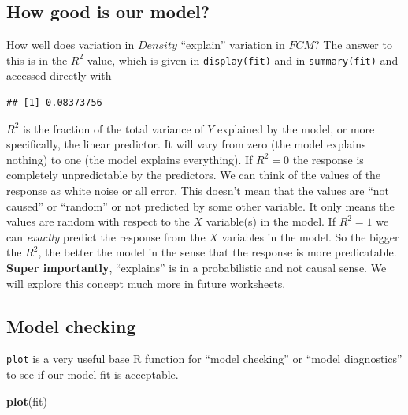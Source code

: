 \documentclass[]{book}
\newenvironment{Shaded}{\begin{snugshade}}{\end{snugshade}}
\newcommand{\KeywordTok}[1]{\textcolor[rgb]{0.13,0.29,0.53}{\textbf{#1}}}
\newcommand{\OperatorTok}[1]{\textcolor[rgb]{0.81,0.36,0.00}{\textbf{#1}}}
\newcommand{\NormalTok}[1]{#1}
\begin{document}
\subsection{How good is our model?}\label{how-good-is-our-model}

How well does variation in \(Density\) ``explain'' variation in \(FCM\)?
The answer to this is in the \(R^2\) value, which is given in
\texttt{display(fit)} and in \texttt{summary(fit)} and accessed directly
with

\begin{Shaded}
\end{Shaded}

\begin{verbatim}
## [1] 0.08373756
\end{verbatim}

\(R^2\) is the fraction of the total variance of \(Y\) explained by the
model, or more specifically, the linear predictor. It will vary from
zero (the model explains nothing) to one (the model explains
everything). If \(R^2=0\) the response is completely unpredictable by
the predictors. We can think of the values of the response as white
noise or all error. This doesn't mean that the values are ``not caused''
or ``random'' or not predicted by some other variable. It only means the
values are random with respect to the \(X\) variable(s) in the model. If
\(R^2=1\) we can \emph{exactly} predict the response from the \(X\)
variables in the model. So the bigger the \(R^2\), the better the model
in the sense that the response is more predicatable. \textbf{Super
importantly}, ``explains'' is in a probabilistic and not causal sense.
We will explore this concept much more in future worksheets.

\subsection{Model checking}

\texttt{plot} is a very useful base R function for ``model checking'' or
``model diagnostics'' to see if our model fit is acceptable.

\begin{Shaded}
\begin{Highlighting}[]
\KeywordTok{plot}\NormalTok{(fit)}
\end{Highlighting}
\end{Shaded}
\end{document}
